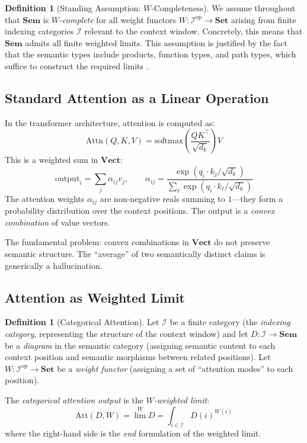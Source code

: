 \documentclass[11pt,a4paper]{article}
\theoremstyle{plain}
\theoremstyle{definition}
\newtheorem{definition}[theorem]{Definition}
\theoremstyle{remark}
\newcommand{\Sem}{\mathbf{Sem}}
\newcommand{\Vect}{\mathbf{Vect}}
\newcommand{\Set}{\mathbf{Set}}
\newcommand{\op}{\mathrm{op}}
\begin{document}
\begin{definition}[Standing Assumption: $W$-Completeness]\label{ax:w-complete}
We assume throughout that $\Sem$ is \emph{$W$-complete} for all weight functors $W : \mathcal{I}^{\op} \to \Set$ arising from finite indexing categories $\mathcal{I}$ relevant to the context window.
Concretely, this means that $\Sem$ admits all finite weighted limits.
This assumption is justified by the fact that the semantic types include products, function types, and path types, which suffice to construct the required limits \cite{kelly1982}.
\end{definition}

\subsection{Standard Attention as a Linear Operation}

In the transformer architecture, attention is computed as:
\begin{equation}\label{eq:standard-attention}
  \mathrm{Attn}(Q, K, V) = \mathrm{softmax}\!\left(\frac{QK^\top}{\sqrt{d_k}}\right) V
\end{equation}
This is a weighted sum in $\Vect$:
\[
  \mathrm{output}_i = \sum_j \alpha_{ij} v_j, \qquad \alpha_{ij} = \frac{\exp(q_i \cdot k_j / \sqrt{d_k})}{\sum_\ell \exp(q_i \cdot k_\ell / \sqrt{d_k})}
\]
The attention weights $\alpha_{ij}$ are non-negative reals summing to $1$---they form a probability distribution over the context positions.
The output is a \emph{convex combination} of value vectors.

The fundamental problem: convex combinations in $\Vect$ do not preserve semantic structure.
The ``average'' of two semantically distinct claims is generically a hallucination.

\subsection{Attention as Weighted Limit}

\begin{definition}[Categorical Attention]\label{def:cat-attention}
Let $\mathcal{I}$ be a finite category (the \emph{indexing category}, representing the structure of the context window) and let $D : \mathcal{I} \to \Sem$ be a \emph{diagram} in the semantic category (assigning semantic content to each context position and semantic morphisms between related positions).
Let $W : \mathcal{I}^{\op} \to \Set$ be a \emph{weight functor} (assigning a set of ``attention modes'' to each position).

The \emph{categorical attention output} is the \emph{$W$-weighted limit}:
\begin{equation}\label{eq:weighted-limit}
  \mathrm{Att}(D, W) = \lim^W D = \int_{i \in \mathcal{I}} D(i)^{W(i)}
\end{equation}
where the right-hand side is the \emph{end} formulation of the weighted limit.
\end{definition}
\end{document}
